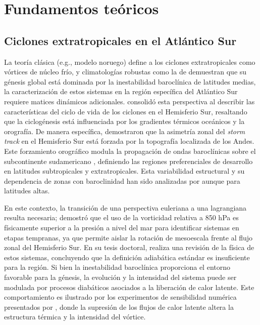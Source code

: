 \chapter{Fundamentos teóricos}\label{ch:theoretical_background}


\section{Ciclones extratropicales en el Atlántico Sur}\label{sec:tb_fundamentos}
La teoría clásica (e.g., modelo noruego) define a los ciclones extratropicales como vórtices de núcleo frío, y climatologías robustas como la de \citet{hoskins2005new} demuestran que su génesis global está dominada por la inestabilidad baroclínica de latitudes medias, la caracterización de estos sistemas en la región específica del Atlántico Sur requiere matices dinámicos adicionales. \citet{sinclair1995climatology} consolidó esta perspectiva al describir las características del ciclo de vida de los ciclones en el Hemisferio Sur, resaltando que la ciclogénesis está influenciada por los gradientes térmicos oceánicos y la orografía. De manera específica, \citet{inatsu2004zonal} demostraron que la asimetría zonal del \textit{storm track} en el Hemisferio Sur está forzada por la topografía localizada de los Andes. Este forzamiento orográfico modula la propagación de ondas baroclínicas sobre el subcontinente sudamericano \citep{vera2002cold}, definiendo las regiones preferenciales de desarrollo en latitudes subtropicales y extratropicales. Esta variabilidad estructural y su dependencia de zonas con baroclinidad han sido analizadas por \citet{simmonds1999southern} aunque para latitudes altas.

En este contexto, la transición de una perspectiva euleriana a una lagrangiana resulta necesaria; \citet{sinclair1994objective} demostró que el uso de la vorticidad relativa a 850 hPa es físicamente superior a la presión a nivel del mar para identificar sistemas en etapas tempranas, ya que permite aislar la rotación de mesoescala frente al flujo zonal del Hemisferio Sur. En su tesis doctoral, \citet{coutodesouza2024thesis} realiza una revisión de la física de estos sistemas, concluyendo que la definición adiabática estándar es insuficiente para la región. Si bien la inestabilidad baroclínica proporciona el entorno favorable para la génesis, la evolución y la intensidad del sistema puede ser modulada por procesos diabáticos asociados a la liberación de calor latente. Este comportamiento es ilustrado por los experimentos de sensibilidad numérica presentados por \citet{reboita2022from}, donde la supresión de los flujos de calor latente altera la estructura térmica y la intensidad del vórtice.

